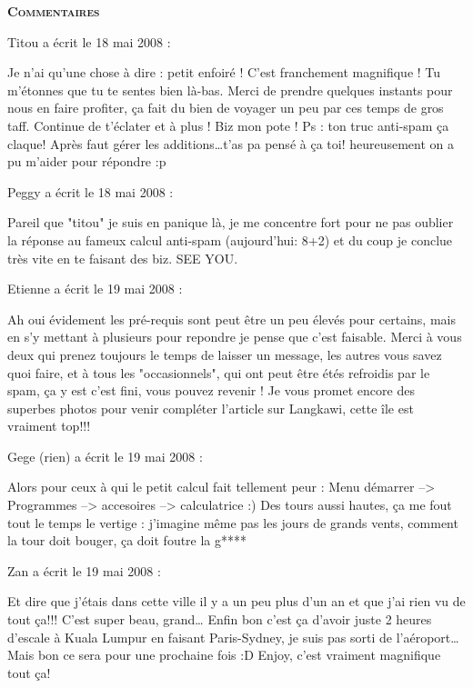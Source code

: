 \bigskip
\textbf{\textsc{Commentaires}}

\medskip
Titou a écrit le 18 mai 2008 :
\begin{displayquote}
Je n'ai qu'une chose à dire : petit enfoiré ! C'est franchement magnifique ! Tu m'étonnes que tu te sentes bien là-bas. Merci de prendre quelques instants pour nous en faire profiter, ça fait du bien de voyager un peu par ces temps de gros taff. Continue de t'éclater et à plus ! Biz mon pote !
Ps : ton truc anti-spam ça claque! Après faut gérer les additions\dots t'as pa pensé à ça toi! heureusement on a pu m'aider pour répondre :p
\end{displayquote}

\medskip
Peggy a écrit le 18 mai 2008 :
\begin{displayquote}
Pareil que "titou" je suis en panique là, je me concentre fort pour ne pas oublier la réponse au fameux calcul anti-spam (aujourd'hui: 8+2) et du coup je conclue très vite en te faisant des biz.
SEE YOU.
\end{displayquote}

\medskip
Etienne a écrit le 19 mai 2008 :
\begin{displayquote}
Ah oui évidement les pré-requis sont peut être un peu élevés pour certains, mais en s'y mettant à plusieurs pour repondre je pense que c'est faisable.
Merci à vous deux qui prenez toujours le temps de laisser un message, les autres vous savez quoi faire, et à tous les "occasionnels", qui ont peut être étés refroidis par le spam, ça y est c'est fini, vous pouvez revenir !
Je vous promet encore des superbes photos pour venir compléter l'article sur Langkawi, cette île est vraiment top!!!
\end{displayquote}

\medskip
Gege (rien) a écrit le 19 mai 2008 :
\begin{displayquote}
Alors pour ceux à qui le petit calcul fait tellement peur : Menu démarrer --> Programmes --> accesoires --> calculatrice :)
Des tours aussi hautes, ça me fout tout le temps le vertige : j'imagine même pas les jours de grands vents, comment la tour doit bouger, ça doit foutre la g****
\end{displayquote}

\medskip
Zan a écrit le 19 mai 2008 :
\begin{displayquote}
Et dire que j'étais dans cette ville il y a un peu plus d'un an et que j'ai rien vu de tout ça!!! C'est super beau, grand\dots
Enfin bon c'est ça d'avoir juste 2 heures d'escale à Kuala Lumpur en faisant Paris-Sydney, je suis pas sorti de l'aéroport\dots Mais bon ce sera pour une prochaine fois :D
Enjoy, c'est vraiment magnifique tout ça!
\end{displayquote}

\vfill
